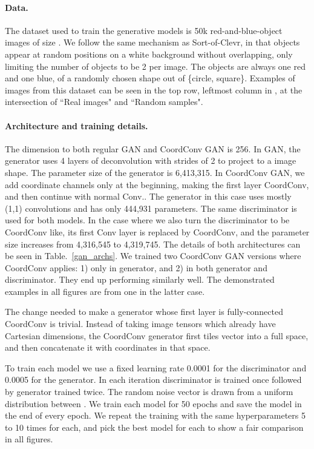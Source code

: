 \documentclass{article}
\begin{document}
\paragraph{Data.} The dataset used to train the generative models is 50k red-and-blue-object images of size . We follow the same mechanism as Sort-of-Clevr, in that objects appear at random positions on a white background without overlapping, only limiting the number of objects to be 2 per image. The objects are always one red and one blue, of a randomly chosen shape out of \{circle, square\}. Examples of images from this dataset can be seen in the top row, leftmost column in , at the intersection of ``Real images" and  ``Random samples".

\paragraph{Architecture and training details.} The  dimension to both regular GAN and CoordConv GAN is 256. In GAN, the generator uses 4 layers of deconvolution with strides of 2 to project  to a  image shape. The parameter size of the generator is 6,413,315. In CoordConv GAN, we add coordinate channels only at the beginning, making the first layer CoordConv, and then continue with normal Conv.. The generator in this case uses mostly (1,1) convolutions and has only 444,931 parameters. The same discriminator is used for both models. In the case where we also turn the discriminator to be CoordConv like, its first Conv layer is replaced by CoordConv, and the parameter size increases from 4,316,545 to 4,319,745. The details of both architectures can be seen in Table.~\ref{gan_archs}. We trained two CoordConv GAN versions where CoordConv applies: 1) only in generator, and 2) in both generator and discriminator. They end up performing similarly well. The demonstrated examples in all figures are from one in the latter case.

The change needed to make a generator whose first layer is fully-connected CoordConv is trivial. Instead of taking image tensors which already have Cartesian dimensions, the CoordConv generator first tiles  vector into a full  space, and then concatenate it with coordinates in that space.

To train each model we use a fixed learning rate 0.0001 for the discriminator and 0.0005 for the generator. In each iteration discriminator is trained once followed by generator trained twice. The random noise vector  is drawn from a uniform distribution between . We train each model for 50 epochs and save the model in the end of every epoch. We repeat the training with the same hyperparameters 5 to 10 times for each, and pick the best model for each to show a fair comparison in all figures.
\end{document}
